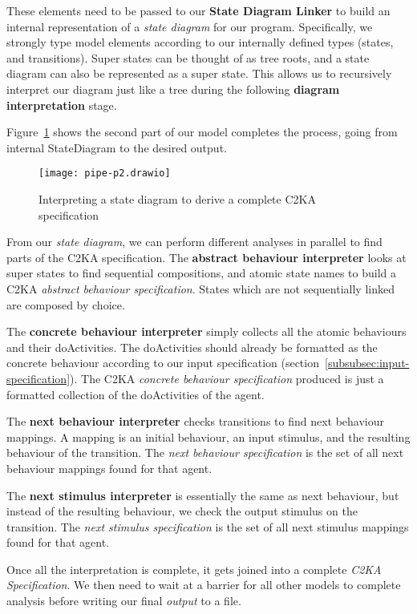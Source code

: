 These elements need to be passed to our \textbf{State Diagram Linker}
to build an internal representation of a \textit{state diagram} for our program.
Specifically, we strongly type model elements according to our internally defined types (states, and transitions).
Super states can be thought of as tree roots, and a state diagram can also be represented as a super state.
This allows us to recursively interpret our diagram just like a tree during the following \textbf{diagram interpretation} stage.

Figure~\ref{fig:pipe-2} shows the  second part of our model completes the process, going from internal StateDiagram to the desired output.
\begin{figure}[h]
    \centering
    \texttt{[image: pipe-p2.drawio]}
    \caption{Interpreting a state diagram to derive a complete C2KA specification}
    \label{fig:pipe-2}
\end{figure}

From our \textit{state diagram}, we can perform different analyses in parallel to find parts of the C2KA specification.
The \textbf{abstract behaviour interpreter} looks at super states to find sequential compositions,
and atomic state names to build a C2KA \textit{abstract behaviour specification}.
States which are not sequentially linked are composed by choice.

The \textbf{concrete behaviour interpreter} simply collects all the atomic behaviours and their doActivities.
The doActivities should already be formatted as the concrete behaviour according to our input specification (section~\ref{subsubsec:input-specification}).
The C2KA \textit{concrete behaviour specification} produced is just a formatted collection of the doActivities of the agent.

The \textbf{next behaviour interpreter} checks transitions to find next behaviour mappings.
A mapping is an initial behaviour, an input stimulus, and the resulting behaviour of the transition.
The \textit{next behaviour specification} is the set of all next behaviour mappings found for that agent.

The \textbf{next stimulus interpreter} is essentially the same as next behaviour,
but instead of the resulting behaviour, we check the output stimulus on the transition.
The \textit{next stimulus specification} is the set of all next stimulus mappings found for that agent.

Once all the interpretation is complete, it gets joined into a complete \textit{C2KA Specification}.
We then need to wait at a barrier for all other models to complete analysis before writing our final \textit{output} to a file.

